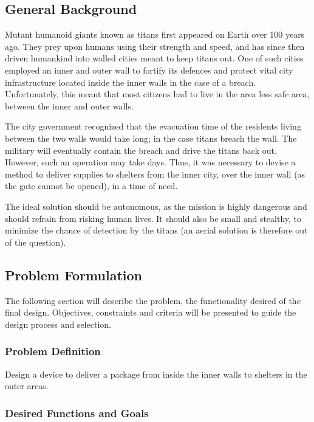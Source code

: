 \documentclass[ece]{uw-wkrpt}
\begin{document}
\subsection{General Background}

Mutant humanoid giants known as titans first appeared on Earth over 100 years ago. They prey upon humans using their strength and speed, and has since then driven humankind into walled cities meant to keep titans out. One of such cities employed an inner and outer wall to fortify its defences and protect vital city infrastructure located inside the inner walls in the case of a breach. Unfortunately, this meant that most citizens had to live in the area less safe area, between the inner and outer walls.

The city government recognized that the evacuation time of the residents living between the two walls would take long; in the case titans breach the wall. The military will eventually contain the breach and drive the titans back out. However, such an operation may take days. Thus, it was necessary to devise a method to deliver supplies to shelters from the inner city, over the inner wall (as the gate cannot be opened), in a time of need.

The ideal solution should be autonomous, as the mission is highly dangerous and should refrain from risking human lives. It should also be small and stealthy, to minimize the chance of detection by the titans (an aerial solution is therefore out of the question).


\subsection{Problem Formulation}

The following section will describe the problem, the functionality desired of the final design. Objectives, constraints and criteria will be presented to guide the design process and selection.

\subsubsection{Problem Definition}

Design a device to deliver a package from inside the inner walls to shelters in the outer areas.

\subsubsection{Desired Functions and Goals}
\end{document}
